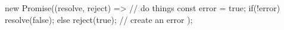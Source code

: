 new Promise((resolve, reject) => {
    // do things
    const error = true;
    if(!error) {
        resolve(false);
    } else {
        reject(true); // create an error
    }
});